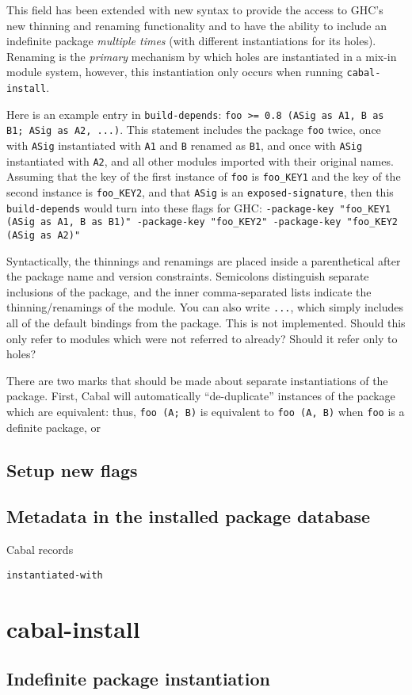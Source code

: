 \documentclass{article}
\newcommand{\Red}[1]{{\color{red} #1}}
\begin{document}
This field has been extended with new syntax
to provide the access to GHC's new thinning and renaming functionality
and to have the ability to include an indefinite package \emph{multiple times}
(with different instantiations for its holes).  Renaming is the
\emph{primary} mechanism by which holes are instantiated in a mix-in module
system, however, this instantiation only occurs when running \texttt{cabal-install}.

Here is an example entry in \texttt{build-depends}: \texttt{foo >= 0.8
(ASig as A1, B as B1; ASig as A2, ...)}.  This statement includes the
package \texttt{foo} twice, once with \texttt{ASig} instantiated with
\texttt{A1} and \texttt{B} renamed as \texttt{B1}, and once with
\texttt{ASig} instantiated with \texttt{A2}, and all other modules
imported with their original names.  Assuming that the key of the first
instance of \texttt{foo} is \texttt{foo\_KEY1} and the key of the second instance
is \texttt{foo\_KEY2}, and that \texttt{ASig} is an \texttt{exposed-signature}, then this \texttt{build-depends} would turn into
these flags for GHC: \texttt{-package-key "foo\_KEY1 (ASig as A1, B as B1)" -package-key "foo\_KEY2" -package-key "foo\_KEY2 (ASig as A2)"}

Syntactically, the thinnings and renamings are placed inside a
parenthetical after the package name and version constraints.
Semicolons distinguish separate inclusions of the package, and the inner
comma-separated lists indicate the thinning/renamings of the module.
You can also write \texttt{...}, which simply
includes all of the default bindings from the package.
\Red{This is not implemented. Should this only refer to modules which were not referred to already? Should it refer only to holes?}

There are two marks that should be made about separate instantiations of
the package.  First, Cabal will automatically ``de-duplicate'' instances of
the package which are equivalent: thus, \texttt{foo (A; B)} is equivalent to
\texttt{foo (A, B)} when \texttt{foo} is a definite package, or 

\subsection{Setup new flags}

\subsection{Metadata in the installed package database}

Cabal records

\texttt{instantiated-with}

\section{cabal-install}

\subsection{Indefinite package instantiation}
\end{document}
